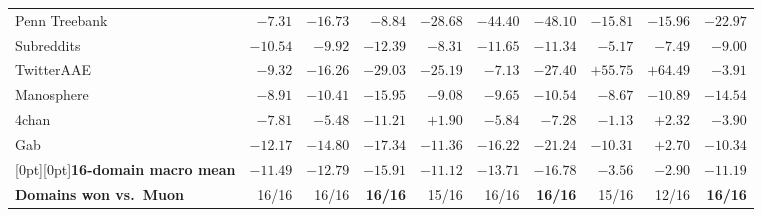 \begin{table}[tbp]
\begin{tabularx}{\textwidth}{@{}>{\raggedright\arraybackslash}Xrrrrrrrrr@{}}
Penn Treebank & $-7.31$ & $\mathbf{-16.73}$ & $-8.84$ & $-28.68$ & $-44.40$ & $\mathbf{-48.10}$ & $-15.81$ & $-15.96$ & $\mathbf{-22.97}$ \\
Subreddits & $-10.54$ & $-9.92$ & $\mathbf{-12.39}$ & $-8.31$ & $\mathbf{-11.65}$ & $-11.34$ & $-5.17$ & $-7.49$ & $\mathbf{-9.00}$ \\
TwitterAAE & $-9.32$ & $-16.26$ & $\mathbf{-29.03}$ & $-25.19$ & $-7.13$ & $\mathbf{-27.40}$ & $+55.75$ & $+64.49$ & $\mathbf{-3.91}$ \\
Manosphere & $-8.91$ & $-10.41$ & $\mathbf{-15.95}$ & $-9.08$ & $-9.65$ & $\mathbf{-10.54}$ & $-8.67$ & $-10.89$ & $\mathbf{-14.54}$ \\
4chan & $-7.81$ & $-5.48$ & $\mathbf{-11.21}$ & $+1.90$ & $-5.84$ & $\mathbf{-7.28}$ & $-1.13$ & $+2.32$ & $\mathbf{-3.90}$ \\
Gab & $-12.17$ & $-14.80$ & $\mathbf{-17.34}$ & $-11.36$ & $-16.22$ & $\mathbf{-21.24}$ & $-10.31$ & $+2.70$ & $\mathbf{-10.34}$ \\
\midrule
\rowcolor{rowtint}[0pt][0pt]\textbf{16-domain macro mean} & $-11.49$ & $-12.79$ & $\mathbf{-15.91}$ & $-11.12$ & $-13.71$ & $\mathbf{-16.78}$ & $-3.56$ & $-2.90$ & $\mathbf{-11.19}$ \\
\textbf{Domains won vs.\ Muon} & 16/16 & 16/16 & \textbf{16/16} & 15/16 & 16/16 & \textbf{16/16} & 15/16 & 12/16 & \textbf{16/16} \\
\bottomrule\end{tabularx}
\end{table}
